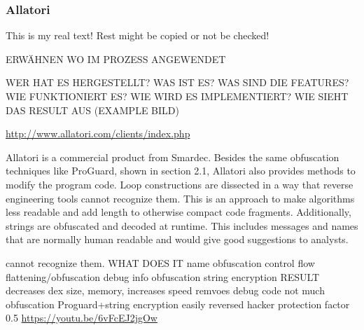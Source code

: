 \subsubsection{Allatori} \label{subsubsection:counter-reengineering-optobf-allatori}
This is my real text! Rest might be copied or not be checked!


ERWÄHNEN WO IM PROZESS ANGEWENDET\newline

WER HAT ES HERGESTELLT? WAS IST ES? WAS SIND DIE FEATURES? WIE FUNKTIONIERT ES? WIE WIRD ES IMPLEMENTIERT? WIE SIEHT DAS RESULT AUS (EXAMPLE BILD)\newline

\url{http://www.allatori.com/clients/index.php}\newline

Allatori is a commercial product from Smardec.\newline
Besides the same obfuscation techniques like ProGuard, shown in section 2.1, Allatori also provides methods to modify the program code. Loop constructions are dissected in a way that reverse engineering tools cannot recognize them. This is an approach to make algorithms less readable and add length to otherwise compact code fragments. Additionally, strings are obfuscated and decoded at runtime. This includes messages and names that are normally human readable and would give good suggestions to analysts.\newline

cannot recognize them.
WHAT DOES IT\newline
name obfuscation\newline
control flow flattening/obfuscation\newline
debug info obfuscation\newline
string encryption\newline
RESULT\newline
decreases dex size, memory, increases speed\newline
remvoes debug code\newline
not much obfuscation\newline
Proguard+string encryption\newline
easily reversed\newline
hacker protection factor 0.5\newline
\url{https://youtu.be/6vFcEJ2jgOw}


